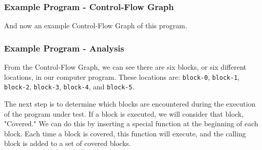 \documentclass{beamer}
\def\code#1{\scriptsize{\texttt{#1}}}
\begin{document}
\begin{frame}[fragile]
\frametitle{Example Program - Control-Flow Graph}
And now an example Control-Flow Graph of this program.

\begin{center}
\end{center}
\end{frame}

\begin{frame}
\frametitle{Example Program - Analysis}
From the Control-Flow Graph, we can see there are six blocks, or six different locations, in our computer program. These locations are: \texttt{block-0}, \texttt{block-1}, \texttt{block-2}, \texttt{block-3}, \texttt{block-4}, and \texttt{block-5}.

The next step is to determine which blocks are encountered during the execution of the program under test. If a block is executed, we will consider that block, "Covered." We can do this by inserting a special function at the beginning of each block. Each time a block is covered, this function will execute, and the calling block is added to a set of covered blocks.
\end{frame}
\end{document}
